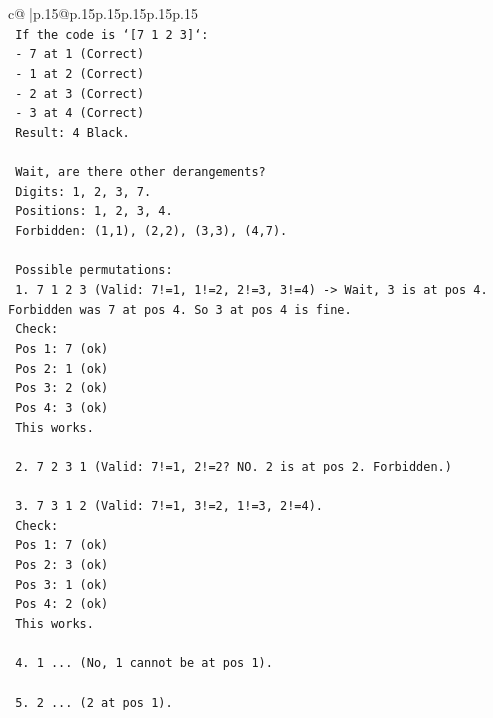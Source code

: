 \documentclass{article}
\begin{document}
{\begin{supertabular}{c@{$\;$}|p{.15\linewidth}@{}p{.15\linewidth}p{.15\linewidth}p{.15\linewidth}p{.15\linewidth}p{.15\linewidth}}
{{{\\ 
\texttt{    If the code is `{[}7 1 2 3{]}`:} \\
\texttt{    {-} 7 at 1 (Correct)} \\
\texttt{    {-} 1 at 2 (Correct)} \\
\texttt{    {-} 2 at 3 (Correct)} \\
\texttt{    {-} 3 at 4 (Correct)} \\
\texttt{    Result: 4 Black.} \\
\\ 
\texttt{    Wait, are there other derangements?} \\
\texttt{    Digits: 1, 2, 3, 7.} \\
\texttt{    Positions: 1, 2, 3, 4.} \\
\texttt{    Forbidden: (1,1), (2,2), (3,3), (4,7).} \\
\\ 
\texttt{    Possible permutations:} \\
\texttt{    1. 7 1 2 3 (Valid: 7!=1, 1!=2, 2!=3, 3!=4) {-}> Wait, 3 is at pos 4. Forbidden was 7 at pos 4. So 3 at pos 4 is fine.} \\
\texttt{       Check:} \\
\texttt{       Pos 1: 7 (ok)} \\
\texttt{       Pos 2: 1 (ok)} \\
\texttt{       Pos 3: 2 (ok)} \\
\texttt{       Pos 4: 3 (ok)} \\
\texttt{       This works.} \\
\\ 
\texttt{    2. 7 2 3 1 (Valid: 7!=1, 2!=2? NO. 2 is at pos 2. Forbidden.)} \\
\\ 
\texttt{    3. 7 3 1 2 (Valid: 7!=1, 3!=2, 1!=3, 2!=4).} \\
\texttt{       Check:} \\
\texttt{       Pos 1: 7 (ok)} \\
\texttt{       Pos 2: 3 (ok)} \\
\texttt{       Pos 3: 1 (ok)} \\
\texttt{       Pos 4: 2 (ok)} \\
\texttt{       This works.} \\
\\ 
\texttt{    4. 1 ... (No, 1 cannot be at pos 1).} \\
\\ 
\texttt{    5. 2 ... (2 at pos 1).} \\
}}}
\end{supertabular}}
\end{document}
